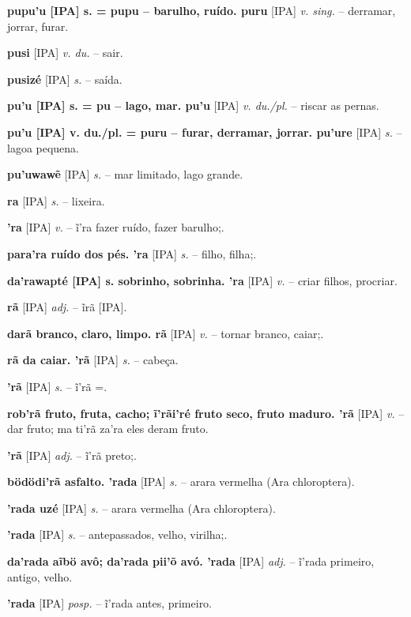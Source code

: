 \textbf{pupu'u [IPA] s. = pupu -- barulho, ruído. puru} [IPA] \textit{v. sing.} -- derramar, jorrar, furar.

\textbf{pusi} [IPA] \textit{v. du.} -- sair.

\textbf{pusizé} [IPA] \textit{s.} -- saída.

\textbf{pu'u [IPA] s. = pu -- lago, mar. pu'u} [IPA] \textit{v. du./pl.} -- riscar as pernas.

\textbf{pu'u [IPA] v. du./pl. = puru -- furar, derramar, jorrar. pu'ure} [IPA] \textit{s.} -- lagoa pequena.

\textbf{pu'uwawẽ} [IPA] \textit{s.} -- mar limitado, lago grande.  %

\textbf{ra} [IPA] \textit{s.} -- lixeira.

\textbf{'ra} [IPA] \textit{v.} -- ĩ'ra fazer ruído, fazer barulho;.

\textbf{para'ra ruído dos pés. 'ra} [IPA] \textit{s.} -- filho, filha;.

\textbf{da'rawapté [IPA] s. sobrinho, sobrinha. 'ra} [IPA] \textit{v.} -- criar filhos, procriar.

\textbf{rã} [IPA] \textit{adj.} -- ĩrã [IPA].

\textbf{darã branco, claro, limpo. rã} [IPA] \textit{v.} -- tornar branco, caiar;.

\textbf{rã da caiar. 'rã} [IPA] \textit{s.} -- cabeça.

\textbf{'rã} [IPA] \textit{s.} -- ĩ'rã =.

\textbf{rob'rã fruto, fruta, cacho; ĩ'rãi'ré fruto seco, fruto maduro. 'rã} [IPA] \textit{v.} -- dar fruto; ma ti'rã za'ra eles deram fruto.

\textbf{'rã} [IPA] \textit{adj.} -- ĩ'rã preto;.

\textbf{bödödi'rã asfalto. 'rada} [IPA] \textit{s.} -- arara vermelha (Ara chloroptera).

\textbf{'rada uzé} [IPA] \textit{s.} -- arara vermelha (Ara chloroptera).

\textbf{'rada} [IPA] \textit{s.} -- antepassados, velho, virilha;.

\textbf{da'rada aĩbö avô; da'rada pii'õ avó. 'rada} [IPA] \textit{adj.} -- ĩ'rada primeiro, antigo, velho.

\textbf{'rada} [IPA] \textit{posp.} -- ĩ'rada antes, primeiro.


